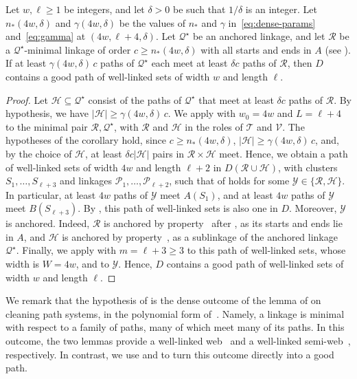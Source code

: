 \documentclass[fontsize=12pt,leading=14pt]{fullpaper}
\newcommand{\Hcal}{\mathcal{H}}
\newcommand{\Pcal}{\mathcal{P}}
\newcommand{\Qcal}{\mathcal{Q}}
\newcommand{\Rcal}{\mathcal{R}}
\newcommand{\Tcal}{\mathcal{T}}
\newcommand{\Vcal}{\mathcal{V}}
\newcommand{\Ycal}{\mathcal{Y}}
\newcounter{step}
\begin{document}
\begin{lemma}\label{lem:dense-anchored}
  Let $w,\ell\ge1$ be integers, and let $\delta>0$ be such that $1/\delta$ is an integer.
  Let $n_*(4w,\delta)$ and $\gamma(4w,\delta)$ be the values of $n_*$ and $\gamma$ in~\eqref{eq:dense-params} and~\eqref{eq:gamma} at $(4w,\ell+4,\delta)$.
  Let $\Qcal^\star$ be an anchored linkage, and let $\Rcal$ be a $\Qcal^\star$-minimal linkage of order $c\ge n_*(4w,\delta)$ with all starts and ends in $A$ (see ).
  If at least $\gamma(4w,\delta)\,c$ paths of $\Qcal^\star$ each meet at least $\delta c$ paths of $\Rcal$, then $D$ contains a good path of well-linked sets of width $w$ and length $\ell$.
\end{lemma}

\begin{proof}
  Let $\Hcal\subseteq\Qcal^\star$ consist of the paths of $\Qcal^\star$ that meet at least $\delta c$ paths of $\Rcal$.
  By hypothesis, we have $|\Hcal|\ge\gamma(4w,\delta)\,c$.
  We apply  with $w_0=4w$ and $L=\ell+4$ to the minimal pair $\Rcal,\Qcal^\star$, with $\Rcal$ and $\Hcal$ in the roles of $\Tcal$ and $\Vcal$.
  The hypotheses of the corollary hold, since $c\ge n_*(4w,\delta)$, $|\Hcal|\ge\gamma(4w,\delta)\,c$, and, by the choice of $\Hcal$, at least $\delta c|\Hcal|$ pairs in $\Rcal\times\Hcal$ meet.
  Hence, we obtain a path of well-linked sets of width $4w$ and length $\ell+2$ in $D(\Rcal\cup\Hcal)$, with clusters $S_1,\dots,S_{\ell+3}$ and linkages $\Pcal_1,\dots,\Pcal_{\ell+2}$, such that  of  holds for some $\Ycal\in\{\Rcal,\Hcal\}$.
  In particular, at least $4w$ paths of $\Ycal$ meet $A(S_1)$, and at least $4w$ paths of $\Ycal$ meet $B(S_{\ell+3})$.
  By , this path of well-linked sets is also one in $D$.
  Moreover, $\Ycal$ is anchored.
  Indeed, $\Rcal$ is anchored by property~ after , as its starts and ends lie in $A$, and $\Hcal$ is anchored by property~, as a sublinkage of the anchored linkage $\Qcal^\star$.
  Finally, we apply  with $m=\ell+3\ge3$ to this path of well-linked sets, whose width is $W=4w$, and to $\Ycal$.
  Hence, $D$ contains a good path of well-linked sets of width $w$ and length $\ell$.
\end{proof}

We remark that the hypothesis of  is the dense outcome of the lemma of \textcite[Lemma~4.7]{KawarabayashiK15} on cleaning path systems, in the polynomial form of~\cite[Lemma~5.11]{HKMM26a}.
Namely, a linkage is minimal with respect to a family of paths, many of which meet many of its paths.
In this outcome, the two lemmas provide a well-linked web~\cite[Lemma~4.7]{KawarabayashiK15} and a well-linked semi-web~\cite[Lemma~5.11]{HKMM26a}, respectively.
In contrast, we use  and  to turn this outcome directly into a good path.
\end{document}
